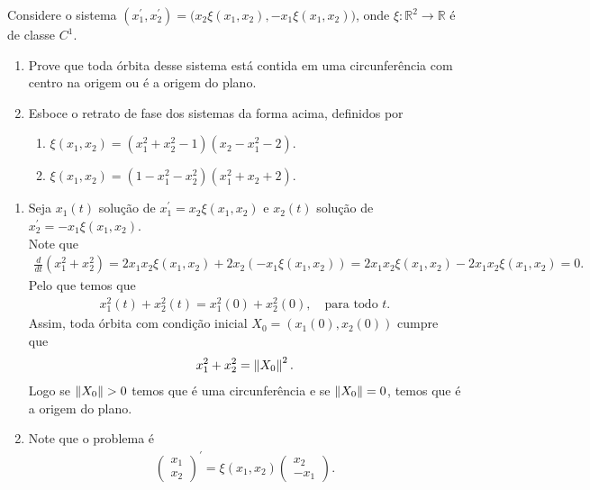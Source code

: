 \begin{homeworkProblem}[1-20]
  Considere o sistema $(x_1^{\prime},x_2^{\prime})=\bigl(x_2\xi(x_1,x_2),-x_1\xi(x_1,x_2)\bigr)$, onde $\xi:\mathbb{R}^2\to\mathbb{R}$ é de classe $C^1$.
  \begin{enumerate}
    \item Prove que toda órbita desse sistema está contida em uma
    circunferência com centro na origem ou é a origem do plano.
    \item Esboce o retrato de fase dos sistemas da forma acima, definidos por
    \begin{enumerate}
      \item $\xi(x_1,x_2)=(x_1^2+x_2^2-1)(x_2-x_1^2-2)$.
      \item $\xi(x_1,x_2)=(1-x_1^2-x_2^2)(x_1^2+x_2+2)$.
    \end{enumerate}
  \end{enumerate}
  \begin{solution}
  \begin{enumerate}
    \item Seja $x_1(t)$ solução de $x^{\prime}_1=x_2\xi(x_1,x_2)$ e $x_2(t)$ solução de $x^{\prime}_2=-x_1\xi(x_1,x_2)$.\\
      Note que
      \begin{align*}
        \frac{d}{dt}(x_1^2+x_2^2)=2x_1x_2\xi(x_1,x_2)+2x_2\left( -x_1\xi(x_1,x_2) \right)=2x_1x_2\xi(x_1,x_2)-2x_1x_2\xi(x_1,x_2)=0.
      \end{align*}
      Pelo que temos que
      \begin{align*}
        x_1^{2}(t)+x_2^2(t)=x_1^{2}(0)+x_2^2(0),\quad\text{para todo }t.
      \end{align*}
      Assim, toda órbita com condição inicial $X_0=(x_1(0),x_2(0))$ cumpre que
      \begin{align*}
        x_1^2+x_2^{2}=\left\|X_0\right\|^{2}.
      \end{align*}
      Logo se $\norm{X_0}>0$ temos que é uma circunferência e se $\left\|X_0\right\|=0$, temos que é a origem do plano.
    \item Note que o problema é
      \begin{align*}
        \begin{pmatrix}
          x_1 \\
          x_2
        \end{pmatrix}^{\prime}=\xi(x_1,x_2)\begin{pmatrix}
          x_2 \\
          -x_1
        \end{pmatrix}.

\end{align*}
\end{enumerate}
\end{solution}
\end{homeworkProblem}
